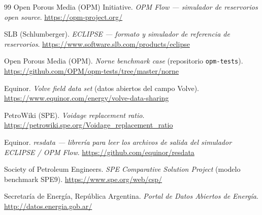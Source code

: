 \documentclass[12pt,a4paper]{article}
\begin{document}
\begin{thebibliography}{99}
   Open Porous Media (OPM) Initiative. \textit{OPM Flow --- simulador de reservorios open
  source}. \url{https://opm-project.org/}

   SLB (Schlumberger). \textit{ECLIPSE --- formato y simulador de referencia de
  reservorios}. \url{https://www.software.slb.com/products/eclipse}

   Open Porous Media (OPM). \textit{Norne benchmark case} (repositorio \texttt{opm-tests}).
  \url{https://github.com/OPM/opm-tests/tree/master/norne}

   Equinor. \textit{Volve field data set} (datos abiertos del campo Volve).
  \url{https://www.equinor.com/energy/volve-data-sharing}

   PetroWiki (SPE). \textit{Voidage replacement ratio}.
  \url{https://petrowiki.spe.org/Voidage_replacement_ratio}

   Equinor. \textit{resdata --- librería para leer los archivos de salida del simulador
  ECLIPSE / OPM Flow}. \url{https://github.com/equinor/resdata}

   Society of Petroleum Engineers. \textit{SPE Comparative Solution Project} (modelo benchmark
  SPE9). \url{https://www.spe.org/web/csp/}

   Secretaría de Energía, República Argentina. \textit{Portal de Datos Abiertos de
  Energía}. \url{http://datos.energia.gob.ar/}
\end{thebibliography}
\end{document}
